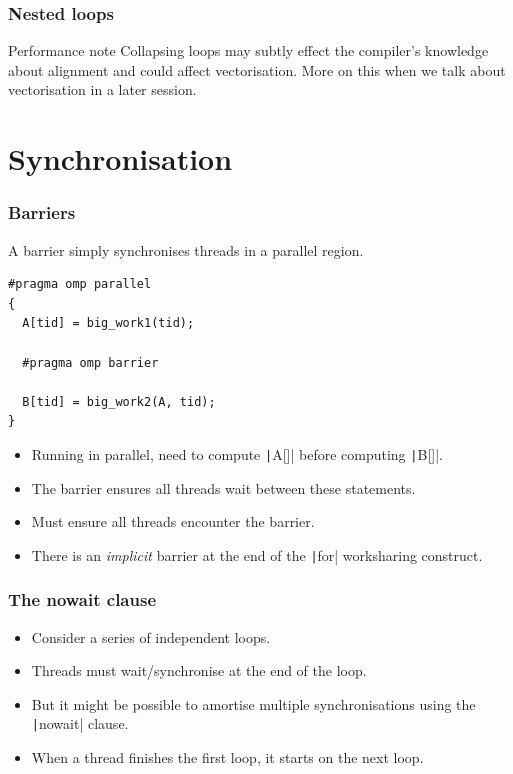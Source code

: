 \documentclass[aspectratio=169]{beamer}
\begin{document}
\begin{frame}
\frametitle{Nested loops}
\begin{block}{Performance note}
Collapsing loops may subtly effect the compiler's knowledge about alignment and could affect vectorisation.
More on this when we talk about vectorisation in a later session.
\end{block}

\end{frame}


\section{Synchronisation}
\begin{frame}[fragile]
\frametitle{Barriers}
A barrier simply synchronises threads in a parallel region.

\begin{verbatim}
#pragma omp parallel
{
  A[tid] = big_work1(tid);

  #pragma omp barrier

  B[tid] = big_work2(A, tid);
}
\end{verbatim}

\begin{itemize}
  \item Running in parallel, need to compute \texttt|A[]| before computing \texttt|B[]|.
  \item The barrier ensures all threads wait between these statements.
  \item Must ensure all threads encounter the barrier.
  \item There is an \emph{implicit} barrier at the end of the \texttt|for| worksharing construct.
\end{itemize}

\end{frame}

\begin{frame}
\frametitle{The nowait clause}
\begin{itemize}
  \item Consider a series of independent loops.
  \item Threads must wait/synchronise at the end of the loop.
  \item But it might be possible to amortise multiple synchronisations using the \texttt|nowait| clause.
  \item When a thread finishes the first loop, it starts on the next loop.
\end{itemize}

\end{frame}
\end{document}
